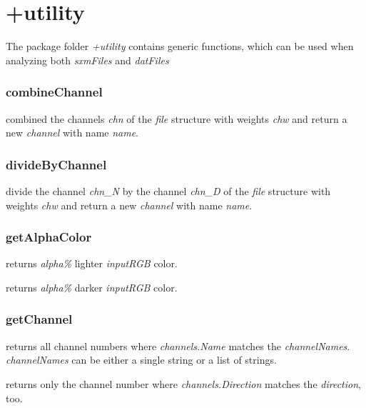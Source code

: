 \section{+utility}

The package folder \emph{+utility} contains generic functions, which can be used when analyzing both \emph{sxmFiles} and \emph{datFiles}

\subsubsection{combineChannel}
\bdf
{} combined the channels \emph{chn} of the \emph{file} structure with weights \emph{chw} and return a new \emph{channel} with name \emph{name}.
\edf

\subsubsection{divideByChannel}
\bdf
{} divide the channel \emph{chn\_N} by the channel \emph{chn\_D} of the \emph{file} structure with weights \emph{chw} and return a new \emph{channel} with name \emph{name}.
\edf

\subsubsection{getAlphaColor}
\bdf
{} returns \emph{alpha\%} lighter \emph{inputRGB} color.

 returns \emph{alpha\%} darker \emph{inputRGB} color.
\edf

\subsubsection{getChannel}
\bdf
{} returns all channel numbers where \emph{channels.Name} matches the \emph{channelNames}. \emph{channelNames} can be either a single string or a list of strings.

 returns only the channel number where \emph{channels.Direction} matches the \emph{direction}, too.
\edf

